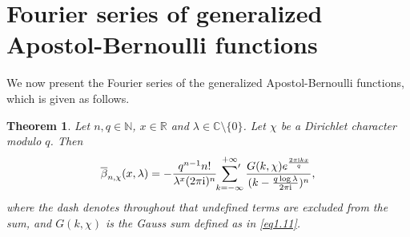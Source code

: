 \documentclass[reqno]{amsart}
\numberwithin{equation}{section}
\newtheorem{theorem}[thm]{Theorem}
\begin{document}
\section{Fourier series of generalized Apostol-Bernoulli functions}\label{sec3}

We now present the Fourier series of the generalized Apostol-Bernoulli functions, which is given as follows.

\begin{theorem}\label{thm3.1} Let $n,q\in\mathbb{N}$, $x\in\mathbb{R}$ and $\lambda\in\mathbb{C}\setminus\{0\}$. Let $\chi$ be a Dirichlet character modulo $q$. Then
\begin{equation}\label{eq3.1}
\overline{\beta}_{n,\chi}(x,\lambda)=-\frac{q^{n-1}n!}{\lambda^{x}(2\pi \mathrm{i})^{n}}\sideset{}{'}\sum_{k=-\infty}^{+\infty}\frac{G(k,\chi)e^{\frac{2\pi\mathrm{i}kx}{q}}}{(k-\frac{q\log\lambda}{2\pi\mathrm{i}})^{n}},
\end{equation}
where the dash denotes throughout that undefined terms are excluded from the
sum, and $G(k,\chi)$ is the Gauss sum defined as in \eqref{eq1.11}.
\end{theorem}
\end{document}
